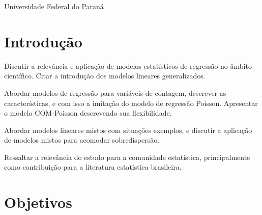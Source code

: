 \documentclass[
	12pt,				%
	openright,			%
	oneside,			%
	a4paper,			%
	english,			%
	brazil,				%
	]{abntex2}
\begin{document}




\begin{center}
{\Large \textsf{Universidade Federal do Paraná}} \\
\end{center}
\imprimircapa


\imprimirfolhaderosto

\tableofcontents*
\cleardoublepage


\textual

\chapter{Introdução}

Discutir a relevância e aplicação de modelos estatísticos 
de regressão no âmbito científico. Citar a introdução dos 
modelos lineares generalizados.

Abordar modelos de regressão para variáveis de contagem, 
descrever as características, e com isso a imitação do 
modelo de regressão Poisson. Apresentar o modelo COM-Poisson
descrevendo sua flexibilidade.

Abordar modelos lineares mistos com situações exemplos, e 
discutir a aplicação de modelos mistos para acomodar 
sobredispersão.

Ressaltar a relevância do estudo para a comunidade 
estatística, principalmente como contribuição para a 
literatura estatística brasileira.


\chapter{Objetivos}
\end{document}
